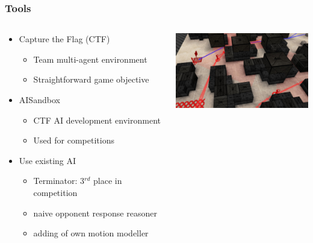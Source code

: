\documentclass{beamer}
\begin{document}
\begin{frame}
    \frametitle{Tools}
    \begin{minipage}[0.5\textheight]{\textwidth}
        \begin{columns}[T]
            \begin{column}{0.55\textwidth}
                \begin{itemize}
                    \item{Capture the Flag (CTF)}
                        \begin{itemize}
                            \item Team multi-agent environment
                            \item Straightforward game objective
                        \end{itemize}
                    \item{AISandbox}
                        \begin{itemize}
                            \item CTF AI development environment
                            \item Used for competitions
                        \end{itemize}
                    \item{Use existing AI}
                        \begin{itemize}
                            \item Terminator: 3$^{rd}$ place in competition
                            \item naive opponent response reasoner
                            \item adding of own motion modeller
                        \end{itemize}
                \end{itemize}
            \end{column}
            \begin{column}{1\textwidth}
                \includegraphics[width=6cm]{CTF_Sandbox.jpg}
            \end{column}
        \end{columns}
    \end{minipage}
\end{frame}
\end{document}
